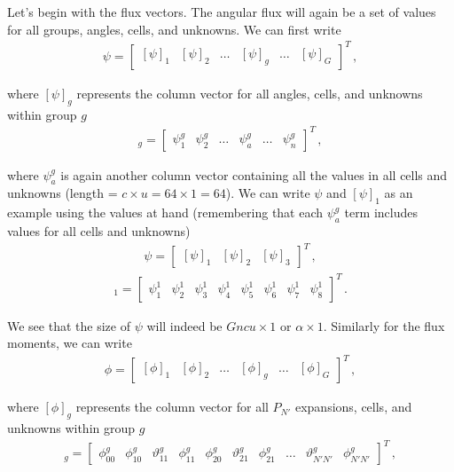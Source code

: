 \documentclass[10pt]{article}
\begin{document}
Let's begin with the flux vectors. The angular flux will again be a set of values for all groups, angles, cells, and unknowns. We can first write 
%
\begin{align*}
\psi =
\begin{bmatrix}
    [\psi]_1 & [\psi]_2 & \dots & [\psi]_g & \dots & [\psi]_G 
\end{bmatrix} ^ T\,,
\end{align*}

where $[\psi]_g$ represents the column vector for all angles, cells, and unknowns within group $g$
%
\begin{align*}
[\psi]_g =
\begin{bmatrix}
    \psi_1^g & \psi_2^g & \dots & \psi_a^g &  \dots & \psi_n^g
\end{bmatrix} ^ T\,,
\end{align*}

where $\psi_a^g$ is again another column vector containing all the values in all cells and unknowns (length = $c \times u = 64 \times 1 = 64$). We can write $\psi$ and $[\psi]_1$ as an example using the values at hand (remembering that each $\psi_a^g$ term includes values for all cells and unknowns)
%
\begin{align*}
\psi =
\begin{bmatrix}
    [\psi]_1 & [\psi]_2 & [\psi]_3
\end{bmatrix} ^ T\,,
\end{align*}
\vspace{-20pt}
\begin{align*}
[\psi]_1 =
\begin{bmatrix}
    \psi_1^1 & \psi_2^1 & \psi_3^1 & \psi_4^1 & \psi_5^1 & \psi_6^1 & \psi_7^1 & \psi_8^1
\end{bmatrix} ^ T\,.
\end{align*}

We see that the size of $\psi$ will indeed be $Gncu \times 1$ or $\alpha \times 1$. Similarly for the flux moments, we can write
%
\begin{align*}
\phi =
\begin{bmatrix}
    [\phi]_1 & [\phi]_2 & \dots & [\phi]_g & \dots & [\phi]_G 
\end{bmatrix} ^ T\,,
\end{align*}

where $[\phi]_g$ represents the column vector for all $P_{N'}$ expansions, cells, and unknowns within group $g$
%
\begin{align*}
[\phi]_g =
\begin{bmatrix}
    \phi_{00}^g & \phi_{10}^g & \vartheta_{11}^g & \phi_{11}^g & \phi_{20}^g & \vartheta_{21}^g & \phi_{21}^g &  \dots & \vartheta_{N'N'}^g & \phi_{N'N'}^g
\end{bmatrix} ^ T\,,
\end{align*}
\end{document}
